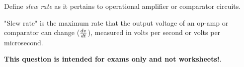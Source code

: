 

Define {\it slew rate} as it pertains to operational amplifier or comparator circuits.







"Slew rate" is the maximum rate that the output voltage of an op-amp or comparator can change ($dv \over dt$), measured in volts per second or volts per microsecond.







{\bf This question is intended for exams only and not worksheets!}.



